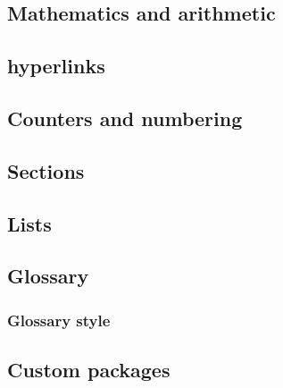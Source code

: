     \subsection{Mathematics and arithmetic}
    \label{sec:tutorial/preamble/math}
    
    
    \subsection*{\thesubsection\hspace{1em}\Glspl{hyperlink}}
    \label{sec:tutorial/preamble/ref}
    
    
    \subsection{Counters and numbering}
    \label{sec:tutorial/preamble/count}
    
    
    \subsection{Sections}
    \label{sec:tutorial/preamble/sec}
    
    
    \subsection{Lists}
    \label{sec:tutorial/preamble/list}
    
    
    \subsection{Glossary}
    \label{sec:tutorial/preamble/glossary}
    
    
        \subsubsection{Glossary style}
        \label{sec:tutorial/preamble/glossary/style}
        
    
    \subsection*{\thesubsection\hspace{1em}Custom \glspl{package}}
    \label{sec:tutorial/preamble/custom}
    
    
